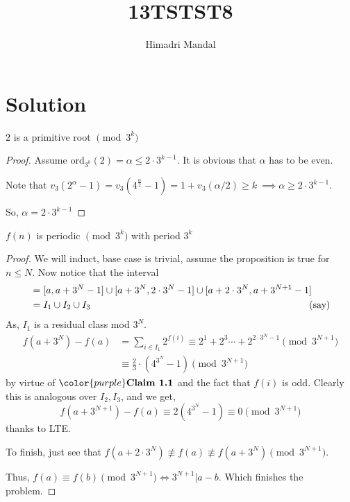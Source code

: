 \documentclass[11pt]{scrartcl}
\title{13TSTST8}
\author{Himadri Mandal}
\begin{document}
\maketitle

\section{Solution}
\begin{soln}\text{ }
\begin{claim}
	$2$ is a primitive root $\pmod{3^k}$
\end{claim}
\begin{proof}
\raggedright
	Assume $\text{ord}_{3^k}(2) = \alpha \leq 2 \cdot 3^{k-1}$. It is obvious that $\alpha$ has to be even.

	Note that $v_3(2^{\alpha} - 1) = v_3(4^{\frac{\alpha}2}-1) = 1 + v_3(\alpha / 2) \geq k \ \implies \alpha \geq 2 \cdot 3^{k-1}$.

	\bigskip
	So, $\alpha = 2 \cdot 3^{k-1}$  
\end{proof}
\begin{claim}
	$f(n)$ is periodic $\pmod{3^k}$ with period $3^k$
\end{claim}
\begin{proof}
	We will induct, base case is trivial, assume the proposition is true for $n \leq N$. 
	Now notice that the interval 
	\begin{align*}
	[a,a+3^{N+1}-1] &= [a, a+3^N-1] \cup [a+3^N, 2\cdot3^N-1] \cup [a+2\cdot3^N, a+3^{N+1}-1]\\
	&= I_1 \cup I_2 \cup I_3\text{\hspace{7.8cm} (say)} 
	\end{align*}
	As, $I_1$ is a residual class mod $3^N$.
\begin{align*}
	f(a+3^{N}) - f(a) &= \sum_{i \in I_1}2^{f(i)} \equiv 2^{1} + 2^3 \cdots + 2^{2 \cdot 3^N - 1} \pmod{3^{N+1}}\\
	&\equiv \frac23 \cdot (4^{3^N} - 1) \pmod{3^{N+1}}
\end{align*}
by virtue of ${\color{purple}\textbf{Claim 1.1}}$ and the fact that $f(i)$ is odd. Clearly this is analogous over $I_2, I_3$, and we get, 
$$f(a+3^{N+1}) - f(a) \equiv 2(4^{3^{N}}-1) \equiv 0 \pmod{3^{N+1}}$$
thanks to LTE.

\raggedright

To finish, just see that $f(a + 2 \cdot 3^{N}) \not\equiv f(a) \not\equiv f(a+3^N) \pmod{3^{N+1}}$.

Thus, $f(a) \equiv f(b) \pmod{3^{N+1}} \iff 3^{N+1} | a-b$. Which finishes the problem.
\end{proof}
\end{soln}
\end{document}
